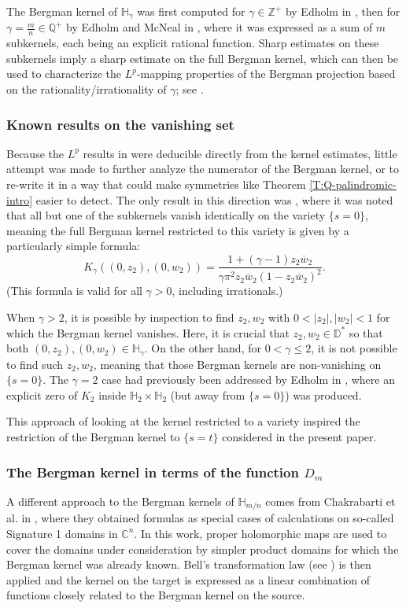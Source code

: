 \documentclass[letterpaper,11pt,reqno]{amsart}
\theoremstyle{plain}
\theoremstyle{definition}
\theoremstyle{remark}
\theoremstyle{remark}
\numberwithin{equation}{section}
\newcommand{\ol}{\overline}
\newcommand{\C}{{\mathbb C}}
\newcommand{\D}{{\mathbb D}}
\newcommand{\h}{{\mathbb H}}
\newcommand{\Q}{{\mathbb Q}}
\newcommand{\Z}{{\mathbb Z}}
\begin{document}
The Bergman kernel of $\h_{\gamma}$ was first computed for $\gamma \in \Z^+$ by Edholm in \cite{Edh16}, then for $\gamma = \frac{m}{n} \in \Q^+$ by Edholm and McNeal in \cite{EdhMcN16b}, where it was expressed as a sum of $m$ subkernels, each being an explicit rational function.
Sharp estimates on these subkernels imply a sharp estimate on the full Bergman kernel, which can then be used to characterize the $L^p$-mapping properties of the Bergman projection based on the rationality/irrationality of $\gamma$; see \cite[Theorem 1.1 and 1.2]{EdhMcN16b}.

\subsubsection{Known results on the vanishing set}
Because the $L^p$ results in \cite{EdhMcN16b} were deducible directly from the kernel estimates, little attempt was made to further analyze the numerator of the Bergman kernel, or to re-write it in a way that could make symmetries like Theorem \ref{T:Q-palindromic-intro} easier to detect.
The only result in this direction was \cite[Theorem 3.3]{EdhMcN16b}, where it was noted that all but one of the subkernels vanish identically on the variety $\{s=0\}$, meaning the full Bergman kernel restricted to this variety is given by a particularly simple formula:
\begin{equation*}
K_\gamma((0,z_2),(0,w_2)) = \frac{1+(\gamma-1)z_2\ol{w}_2}{\gamma \pi^2 z_2\ol{w}_2(1-z_2\ol{w}_2)^2}.
\end{equation*}
(This formula is valid for all $\gamma>0$, including irrationals.)

When $\gamma>2$, it is possible by inspection to find $z_2,w_2$ with $0< |z_2|, |w_2| < 1$ for which the Bergman kernel vanishes. 
Here, it is crucial that $z_2,w_2 \in \D^*$ so that both $(0,z_2),(0,w_2) \in \h_\gamma$.
On the other hand, for $0 < \gamma \le 2$, it is not possible to find such $z_2,w_2$, meaning that those Bergman kernels are non-vanishing on $\{s=0\}$.
The $\gamma = 2$ case had previously been addressed by Edholm in \cite[Corollary 4.2]{Edh16}, where an explicit zero of $K_2$ inside $\h_2 \times \h_2$ (but away from $\{s=0\}$) was produced.

This approach of looking at the kernel restricted to a variety inspired the restriction of the Bergman kernel to $\{s=t\}$ considered in the present paper.

\subsubsection{The Bergman kernel in terms of the function $D_m$}
A different approach to the Bergman kernels of $\h_{m/n}$ comes from Chakrabarti et al. in \cite{CKMM20}, where they obtained formulas as special cases of calculations on so-called Signature 1 domains in $\C^n$.
In this work, proper holomorphic maps are used to cover the domains under consideration by simpler product domains for which the Bergman kernel was already known.
Bell's transformation law (see \cite{belltransactions}) is then applied and the kernel on the target is expressed as a linear combination of functions closely related to the Bergman kernel on the source. 
\end{document}
